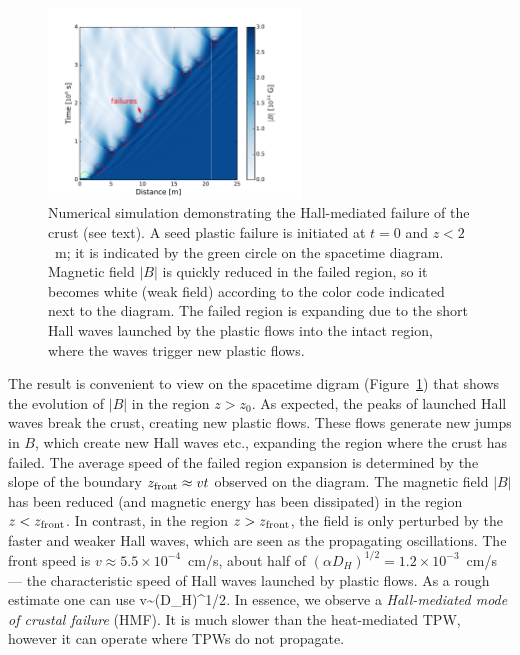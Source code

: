 \begin{figure}[h]
\centering
\includegraphics[width=0.6\textwidth]{pics/chap2/failure.pdf} 
\caption[Numerical simulation demonstrating the Hall-mediated failure of the crust]{
Numerical simulation demonstrating the Hall-mediated failure of the crust
(see text). A seed plastic failure
is initiated at $t=0$ and $z<2$~m; it is indicated by the green circle on the spacetime 
diagram. Magnetic field $|B|$ is quickly reduced in the failed region, so it becomes 
white (weak field) according to the color code indicated next to the diagram. 
The failed region is expanding due to the short Hall waves launched
by the plastic flows into the intact region, 
where the waves trigger new plastic flows.
}
\label{failure}
\end{figure}

The result is convenient to view on the spacetime digram (Figure~\ref{failure}) that shows the 
evolution of $|B|$ in the region $z>z_0$. As expected, the peaks of launched Hall waves 
break the crust, creating new plastic flows. These flows generate new jumps in $B$, which 
create new Hall waves etc., expanding the region where the crust has failed. 
The average speed of the failed region expansion is determined by the slope 
of the boundary $z_{\rm front}\approx vt$ observed on the diagram. The magnetic field 
$|B|$ has been reduced (and magnetic energy has been dissipated) in the region 
$z<z_{\rm front}$. In contrast, in the region $z>z_{\rm front}$, the field is only perturbed by the faster and weaker 
Hall waves, which are seen as the propagating oscillations. 
The front speed is $v\approx 5.5\times 10^{-4}$~cm/s, about half of 
$(\alpha D_H)^{1/2}=1.2\times 10^{-3}$~cm/s --- the characteristic speed of
Hall waves launched by plastic flows. As a rough estimate one can use
\beq
\label{eq:vH}
  v\sim (\alpha D_H)^{1/2}.
\eeq
In essence, we observe a {\it Hall-mediated mode of crustal failure} (HMF). 
It is much slower than the heat-mediated TPW, however it can operate where 
TPWs do not propagate.

